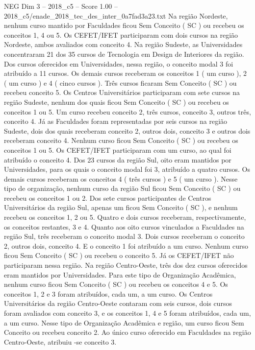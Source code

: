\begin{textsample}{NEG Dim 3 – 2018\_c5 – Score 1.00 – 2018\_c5/enade\_2018\_tec\_des\_inter\_0a7fad3a23.txt}
Na região Nordeste, nenhum curso mantido por Faculdades ficou Sem Conceito ( SC ) ou recebeu os conceitos 1, 4 ou 5.
Os CEFET/IFET participaram com dois cursos na região Nordeste, ambos avaliados com conceito 4.
Na região Sudeste, as Universidades concentraram 21 dos 35 cursos de Tecnologia em Design de Interiores da região.
Dos cursos oferecidos em Universidades, nessa região, o conceito modal 3 foi atribuído a 11 cursos.
Os demais cursos receberam os conceitos 1 ( um curso ), 2 ( um curso ) e 4 ( cinco cursos ).
Três cursos ficaram Sem Conceito ( SC ) ou recebeu conceito 5.
Os Centros Universitários participaram com sete cursos na região Sudeste, nenhum dos quais ficou Sem Conceito ( SC ) ou recebeu os conceitos 1 ou 5.
Um curso recebeu conceito 2, três cursos, conceito 3, outros três, conceito 4.
Já as Faculdades foram representadas por seis cursos na região Sudeste, dois dos quais receberam conceito 2, outros dois, conceito 3 e outros dois receberam conceito 4.
Nenhum curso ficou Sem Conceito ( SC ) ou recebeu os conceitos 1 ou 5.
Os CEFET/IFET participaram com um curso, ao qual foi atribuído o conceito 4.
Dos 23 cursos da região Sul, oito eram mantidos por Universidades, para os quais o conceito modal foi 3, atribuído a quatro cursos.
Os demais cursos receberam os conceitos 4 ( três cursos ) e 5 ( um curso ).
Nesse tipo de organização, nenhum curso da região Sul ficou Sem Conceito ( SC ) ou recebeu os conceitos 1 ou 2.
Dos sete cursos participantes de Centros Universitários da região Sul, apenas um ficou Sem Conceito ( SC ), e nenhum recebeu os conceitos 1, 2 ou 5.
Quatro e dois cursos receberam, respectivamente, os conceitos restantes, 3 e 4.
Quanto aos oito cursos vinculados a Faculdades na região Sul, três receberam o conceito modal 3.
Dois cursos receberam o conceito 2, outros dois, conceito 4.
E o conceito 1 foi atribuído a um curso.
Nenhum curso ficou Sem Conceito ( SC ) ou recebeu o conceito 5.
Já os CEFET/IFET não participaram nessa região.
Na região Centro-Oeste, três dos dez cursos oferecidos eram mantidos por Universidades.
Para este tipo de Organização Acadêmica, nenhum curso ficou Sem Conceito ( SC ) ou recebeu os conceitos 4 e 5.
Os conceitos 1, 2 e 3 foram atribuídos, cada um, a um curso.
Os Centros Universitários da região Centro-Oeste contaram com seis cursos, dois cursos foram avaliados com conceito 3, e os conceitos 1, 4 e 5 foram atribuídos, cada um, a um curso.
Nesse tipo de Organização Acadêmica e região, um curso ficou Sem Conceito ou recebeu conceito 2.
Ao único curso oferecido em Faculdades na região Centro-Oeste, atribuiu -se conceito 3.

\end{textsample}
